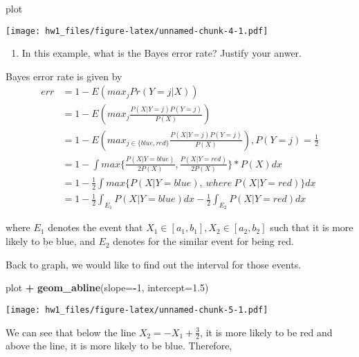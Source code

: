 \documentclass[]{article}
\newenvironment{Shaded}{\begin{snugshade}}{\end{snugshade}}
\newcommand{\DataTypeTok}[1]{\textcolor[rgb]{0.13,0.29,0.53}{#1}}
\newcommand{\DecValTok}[1]{\textcolor[rgb]{0.00,0.00,0.81}{#1}}
\newcommand{\FloatTok}[1]{\textcolor[rgb]{0.00,0.00,0.81}{#1}}
\newcommand{\KeywordTok}[1]{\textcolor[rgb]{0.13,0.29,0.53}{\textbf{#1}}}
\newcommand{\NormalTok}[1]{#1}
\newcommand{\OperatorTok}[1]{\textcolor[rgb]{0.81,0.36,0.00}{\textbf{#1}}}
\newcommand{\StringTok}[1]{\textcolor[rgb]{0.31,0.60,0.02}{#1}}
\providecommand{\tightlist}{%
  \setlength{\itemsep}{0pt}\setlength{\parskip}{0pt}}
\begin{document}
\begin{Shaded}
\begin{Highlighting}[]
\NormalTok{plot}
\end{Highlighting}
\end{Shaded}

\texttt{[image: hw1\_files/figure-latex/unnamed-chunk-4-1.pdf]}

\begin{enumerate}
\def\labelenumi{(\alph{enumi})}
\setcounter{enumi}{4}
\tightlist
\item
  In this example, what is the Bayes error rate? Justify your anwer.
\end{enumerate}

Bayes error rate is given by \[
  \begin{align*}
    err &= 1 - E(max_j Pr(Y = j|X)) \\
        &= 1 - E(max_j \frac{P(X|Y=j)P(Y=j)}{P(X)}) \\
        &= 1 - E(max_{j\in \{blue, red\}} \frac{P(X|Y=j)P(Y=j)}{P(X)}),P(Y=j)=\frac{1}{2} \\
        &= 1 - \int max\{\frac{P(X|Y=blue)}{2P(X)}, \frac{P(X|Y=red)}{2P(X)}\} * P(X)dx \\
        &= 1- \frac{1}{2}\int max\{P(X|Y=blue),\ where\ P(X|Y=red)\}dx \\
        &= 1 - \frac{1}{2}\int_{E_1} P(X|Y=blue)dx - \frac{1}{2}\int_{E_2} P(X|Y=red)dx
  \end{align*}
  \]

where \(E_1\) denotes the event that
\(X_1\in [a_1, b_1], X_2\in [a_2, b_2]\) such that it is more likely to
be blue, and \(E_2\) denotes for the similar event for being red.

Back to graph, we would like to find out the interval for those events.

\begin{Shaded}
\begin{Highlighting}[]
\NormalTok{plot }\OperatorTok{+}\StringTok{ }\KeywordTok{geom_abline}\NormalTok{(}\DataTypeTok{slope=}\OperatorTok{-}\DecValTok{1}\NormalTok{, }\DataTypeTok{intercept=}\FloatTok{1.5}\NormalTok{)}
\end{Highlighting}
\end{Shaded}

\texttt{[image: hw1\_files/figure-latex/unnamed-chunk-5-1.pdf]}

We can see that below the line \(X_2 = -X_1 + \frac{3}{2}\), it is more
likely to be red and above the line, it is more likely to be blue.
Therefore,
\end{document}
